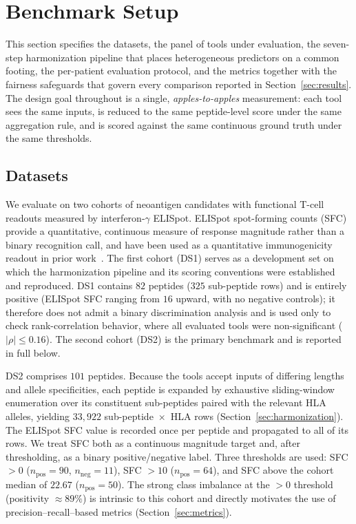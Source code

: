 \section{Benchmark Setup}
\label{sec:setup}

This section specifies the datasets, the panel of tools under evaluation, the
seven-step harmonization pipeline that places heterogeneous predictors on a
common footing, the per-patient evaluation protocol, and the metrics together
with the fairness safeguards that govern every comparison reported in
Section~\ref{sec:results}. The design goal throughout is a single,
\emph{apples-to-apples} measurement: each tool sees the same inputs, is reduced
to the same peptide-level score under the same aggregation rule, and is scored
against the same continuous ground truth under the same thresholds.

\subsection{Datasets}
\label{sec:datasets}

We evaluate on two cohorts of neoantigen candidates with functional T-cell
readouts measured by interferon-$\gamma$ ELISpot. ELISpot spot-forming counts
(SFC) provide a quantitative, continuous measure of response magnitude rather
than a binary recognition call, and have been used as a quantitative
immunogenicity readout in prior work~\cite{TESLA2020}. The first cohort (DS1)
serves as a development set on which the harmonization pipeline and its scoring
conventions were established and reproduced. DS1 contains $82$ peptides
($325$ sub-peptide rows) and is entirely positive (ELISpot SFC ranging from $16$
upward, with no negative controls); it therefore does not admit a binary
discrimination analysis and is used only to check rank-correlation behavior, where
all evaluated tools were non-significant ($|\rho| \le 0.16$). The second cohort
(DS2) is the primary benchmark and is reported in full below.

DS2 comprises $101$ peptides. Because the tools accept inputs of differing
lengths and allele specificities, each peptide is expanded by exhaustive
sliding-window enumeration over its constituent sub-peptides paired with the
relevant HLA alleles, yielding $33{,}922$ sub-peptide~$\times$~HLA rows
(Section~\ref{sec:harmonization}). The ELISpot SFC value is recorded once per
peptide and propagated to all of its rows. We treat SFC both as a continuous
magnitude target and, after thresholding, as a binary positive/negative label.
Three thresholds are used: SFC $>0$ ($n_{\mathrm{pos}}=90$,
$n_{\mathrm{neg}}=11$), SFC $>10$ ($n_{\mathrm{pos}}=64$), and SFC above the
cohort median of $22.67$ ($n_{\mathrm{pos}}=50$). The strong class imbalance at
the $>0$ threshold (positivity $\approx 89\%$) is intrinsic to this cohort and
directly motivates the use of precision--recall--based metrics
(Section~\ref{sec:metrics}).

